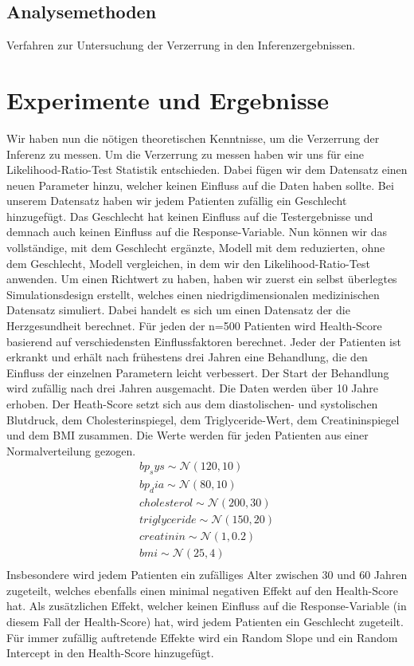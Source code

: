 \documentclass[%
thesis=student,%
coverpage=false,%
titlepage=false,%
headmarks=true, %
german,%
font=libertine, %
math=newpxtx, %
BCOR=5mm,%
coverBCOR=11mm%
]{tumbook}
\theoremstyle{break}
\begin{document}
\section{Analysemethoden}
Verfahren zur Untersuchung der Verzerrung in den Inferenzergebnissen.

\chapter{Experimente und Ergebnisse}

Wir haben nun die nötigen theoretischen Kenntnisse, um die Verzerrung der Inferenz zu messen. Um die Verzerrung zu messen haben wir uns für eine Likelihood-Ratio-Test Statistik entschieden. Dabei fügen wir dem Datensatz einen neuen Parameter hinzu, welcher keinen Einfluss auf die Daten haben sollte. Bei unserem Datensatz haben wir jedem Patienten zufällig ein Geschlecht hinzugefügt. Das Geschlecht hat keinen Einfluss auf die Testergebnisse und demnach auch keinen Einfluss auf die Response-Variable. 
Nun können wir das vollständige, mit dem Geschlecht ergänzte, Modell mit dem reduzierten, ohne dem Geschlecht, Modell vergleichen, in dem wir den Likelihood-Ratio-Test anwenden. 
Um einen Richtwert zu haben, haben wir zuerst ein selbst überlegtes Simulationsdesign erstellt, welches einen niedrigdimensionalen medizinischen Datensatz simuliert. Dabei handelt es sich um einen Datensatz der die Herzgesundheit berechnet. Für jeden der n=500 Patienten wird Health-Score basierend auf verschiedensten Einflussfaktoren berechnet. Jeder der Patienten ist erkrankt und erhält nach frühestens drei Jahren eine Behandlung, die den Einfluss der einzelnen Parametern leicht verbessert. Der Start der Behandlung wird zufällig nach drei Jahren ausgemacht. Die Daten werden über 10 Jahre erhoben. Der Heath-Score setzt sich aus dem diastolischen- und systolischen Blutdruck, dem Cholesterinspiegel, dem Triglyceride-Wert, dem Creatininspiegel und dem BMI zusammen. Die Werte werden für jeden Patienten aus einer Normalverteilung gezogen.
\begin{align*}
	bp_sys \sim \mathcal{N}(120,10) \\
	bp_dia \sim \mathcal{N}(80,10) \\
	cholesterol \sim \mathcal{N}(200,30) \\
	triglyceride \sim \mathcal{N}(150,20) \\
	creatinin \sim \mathcal{N}(1,0.2) \\
	bmi \sim \mathcal{N}(25,4) \\
\end{align*} \noindent
Insbesondere wird jedem Patienten ein zufälliges Alter zwischen 30 und 60 Jahren zugeteilt, welches ebenfalls einen minimal negativen Effekt auf den Health-Score hat. Als zusätzlichen Effekt, welcher keinen Einfluss auf die Response-Variable (in diesem Fall der Health-Score) hat, wird jedem Patienten ein Geschlecht zugeteilt. Für immer zufällig auftretende Effekte wird ein Random Slope und ein Random Intercept in den Health-Score hinzugefügt. 
\end{document}
